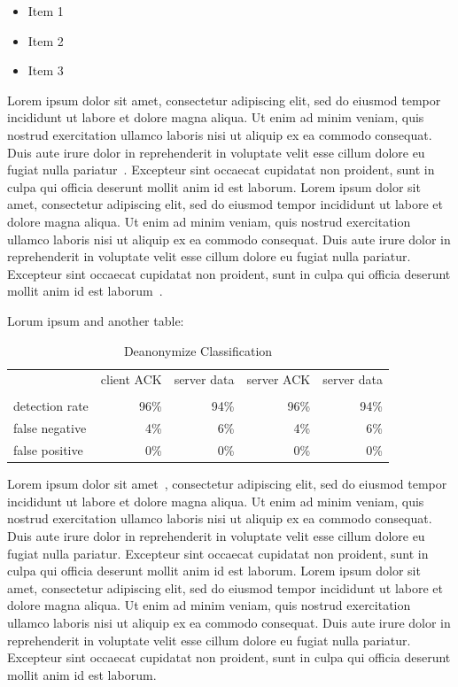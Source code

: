 \documentclass[letterpaper, 10 pt, conference]{ieeeconf}  %
\begin{document}
\begin{itemize}
	\item Item 1
	\item Item 2
	\item Item 3
\end{itemize}

Lorem ipsum dolor sit amet, consectetur adipiscing elit, sed do eiusmod tempor incididunt ut labore et dolore magna aliqua. Ut enim ad minim veniam, quis nostrud exercitation ullamco laboris nisi ut aliquip ex ea commodo consequat. Duis aute irure dolor in reprehenderit in voluptate velit esse cillum dolore eu fugiat nulla pariatur~\cite{Cite9}. Excepteur sint occaecat cupidatat non proident, sunt in culpa qui officia deserunt mollit anim id est laborum. Lorem ipsum dolor sit amet, consectetur adipiscing elit, sed do eiusmod tempor incididunt ut labore et dolore magna aliqua. Ut enim ad minim veniam, quis nostrud exercitation ullamco laboris nisi ut aliquip ex ea commodo consequat. Duis aute irure dolor in reprehenderit in voluptate velit esse cillum dolore eu fugiat nulla pariatur. Excepteur sint occaecat cupidatat non proident, sunt in culpa qui officia deserunt mollit anim id est laborum~\cite{Cite10}.

Lorum ipsum and another table:

\begin{center}
\begin{table}[ht]
	\caption{Deanonymize Classification}
	\centering
	\begin{tabular}{l r r r r}
		\hline\hline
		\ \ & client  ACK & server data & server ACK & server data \\\\ [0.5ex] 
		\hline
		detection rate&96\%&94\%&96\%&94\% \\
		false negative&4\%&6\%&4\%&6\% \\
		false positive&0\%&0\%&0\% &0\% \\ [1ex]
		\hline
	\end{tabular}
	\label{table:nonlin}
\end{table}
\end{center} 

Lorem ipsum dolor sit amet~\cite{Cite11}, consectetur adipiscing elit, sed do eiusmod tempor incididunt ut labore et dolore magna aliqua. Ut enim ad minim veniam, quis nostrud exercitation ullamco laboris nisi ut aliquip ex ea commodo consequat. Duis aute irure dolor in reprehenderit in voluptate velit esse cillum dolore eu fugiat nulla pariatur. Excepteur sint occaecat cupidatat non proident, sunt in culpa qui officia deserunt mollit anim id est laborum. Lorem ipsum dolor sit amet, consectetur adipiscing elit, sed do eiusmod tempor incididunt ut labore et dolore magna aliqua. Ut enim ad minim veniam, quis nostrud exercitation ullamco laboris nisi ut aliquip ex ea commodo consequat. Duis aute irure dolor in reprehenderit in voluptate velit esse cillum dolore eu fugiat nulla pariatur. Excepteur sint occaecat cupidatat non proident, sunt in culpa qui officia deserunt mollit anim id est laborum.
\end{document}
